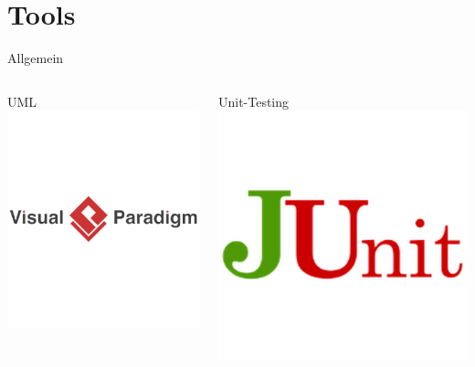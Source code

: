 \documentclass[xcolor=dvipsnames]{beamer}
\begin{document}
    \section{Tools}
    \begin{frame}{Allgemein}
        \begin{columns}
            \begin{column}{0.3\textwidth}
                \begin{block}{UML}
                    \center
                    \includegraphics[width=(\textwidth / 2)]{img/vispar.png} %
                \end{block}
            \end{column}
            \begin{column}{0.3\textwidth}
                \begin{block}{Unit-Testing}
                    \center
                    \includegraphics[width=(\textwidth / 3)]{img/junit.png}

\end{block}
\end{column}
\end{columns}
\end{frame}
\end{document}
